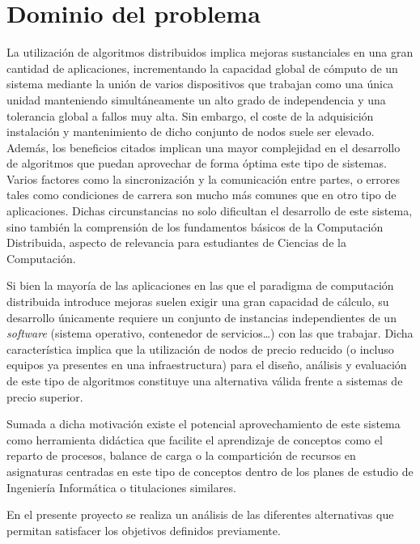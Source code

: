 \chapter{Dominio del problema}

La utilización de algoritmos distribuidos implica mejoras sustanciales en una gran cantidad de aplicaciones, incrementando la capacidad global de cómputo de un sistema mediante la unión de varios dispositivos que trabajan como una única unidad manteniendo simultáneamente un alto grado de independencia y una tolerancia global a fallos muy alta. Sin embargo, el coste de la adquisición instalación y mantenimiento de dicho conjunto de nodos suele ser elevado. Además, los beneficios citados implican una mayor complejidad en el desarrollo de algoritmos que puedan aprovechar de forma óptima este tipo de sistemas. Varios factores como la sincronización y la comunicación entre partes, o errores tales como condiciones de carrera son mucho más comunes que en otro tipo de aplicaciones. Dichas circunstancias no solo dificultan el desarrollo de este sistema, sino también la comprensión de los fundamentos básicos de la Computación Distribuida, aspecto de relevancia para estudiantes de Ciencias de la Computación.

Si bien la mayoría de las aplicaciones en las que el paradigma de computación distribuida introduce mejoras suelen exigir una gran capacidad de cálculo, su desarrollo únicamente requiere un conjunto de instancias independientes de un \textit{software} (sistema operativo, contenedor de servicios\dots) con las que trabajar. Dicha característica implica que la utilización de nodos de precio reducido (o incluso equipos ya presentes en una infraestructura) para el diseño, análisis y evaluación de este tipo de algoritmos constituye una alternativa válida frente a sistemas de precio superior.

Sumada a dicha motivación existe el potencial aprovechamiento de este sistema como herramienta didáctica que facilite el aprendizaje de conceptos como el reparto de procesos, balance de carga o la compartición de recursos en asignaturas centradas en este tipo de conceptos dentro de los planes de estudio de Ingeniería Informática o titulaciones similares.

En el presente proyecto se realiza un análisis de las diferentes alternativas que permitan satisfacer los objetivos definidos previamente.


